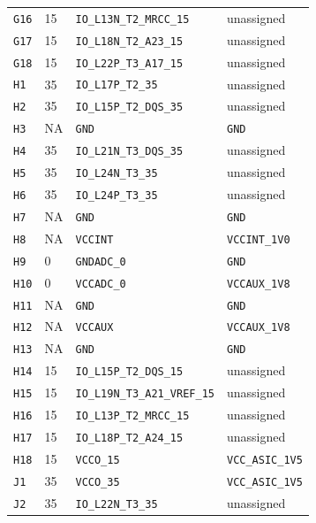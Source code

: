 \documentclass[11pt,a4paper]{article}
\begin{document}
\begin{longtable}{@{}P{13mm}P{13mm}P{78mm}P{62mm}@{}}
\nolinkurl{G16} & 15 & \nolinkurl{IO_L13N_T2_MRCC_15} & \textcolor{muted}{unassigned} \\
\nolinkurl{G17} & 15 & \nolinkurl{IO_L18N_T2_A23_15} & \textcolor{muted}{unassigned} \\
\nolinkurl{G18} & 15 & \nolinkurl{IO_L22P_T3_A17_15} & \textcolor{muted}{unassigned} \\
\nolinkurl{H1} & 35 & \nolinkurl{IO_L17P_T2_35} & \textcolor{muted}{unassigned} \\
\nolinkurl{H2} & 35 & \nolinkurl{IO_L15P_T2_DQS_35} & \textcolor{muted}{unassigned} \\
\nolinkurl{H3} & NA & \nolinkurl{GND} & \nolinkurl{GND} \\
\nolinkurl{H4} & 35 & \nolinkurl{IO_L21N_T3_DQS_35} & \textcolor{muted}{unassigned} \\
\nolinkurl{H5} & 35 & \nolinkurl{IO_L24N_T3_35} & \textcolor{muted}{unassigned} \\
\nolinkurl{H6} & 35 & \nolinkurl{IO_L24P_T3_35} & \textcolor{muted}{unassigned} \\
\nolinkurl{H7} & NA & \nolinkurl{GND} & \nolinkurl{GND} \\
\nolinkurl{H8} & NA & \nolinkurl{VCCINT} & \nolinkurl{VCCINT_1V0} \\
\nolinkurl{H9} & 0 & \nolinkurl{GNDADC_0} & \nolinkurl{GND} \\
\nolinkurl{H10} & 0 & \nolinkurl{VCCADC_0} & \nolinkurl{VCCAUX_1V8} \\
\nolinkurl{H11} & NA & \nolinkurl{GND} & \nolinkurl{GND} \\
\nolinkurl{H12} & NA & \nolinkurl{VCCAUX} & \nolinkurl{VCCAUX_1V8} \\
\nolinkurl{H13} & NA & \nolinkurl{GND} & \nolinkurl{GND} \\
\nolinkurl{H14} & 15 & \nolinkurl{IO_L15P_T2_DQS_15} & \textcolor{muted}{unassigned} \\
\nolinkurl{H15} & 15 & \nolinkurl{IO_L19N_T3_A21_VREF_15} & \textcolor{muted}{unassigned} \\
\nolinkurl{H16} & 15 & \nolinkurl{IO_L13P_T2_MRCC_15} & \textcolor{muted}{unassigned} \\
\nolinkurl{H17} & 15 & \nolinkurl{IO_L18P_T2_A24_15} & \textcolor{muted}{unassigned} \\
\nolinkurl{H18} & 15 & \nolinkurl{VCCO_15} & \nolinkurl{VCC_ASIC_1V5} \\
\nolinkurl{J1} & 35 & \nolinkurl{VCCO_35} & \nolinkurl{VCC_ASIC_1V5} \\
\nolinkurl{J2} & 35 & \nolinkurl{IO_L22N_T3_35} & \textcolor{muted}{unassigned} \\

\end{longtable}
\end{document}
